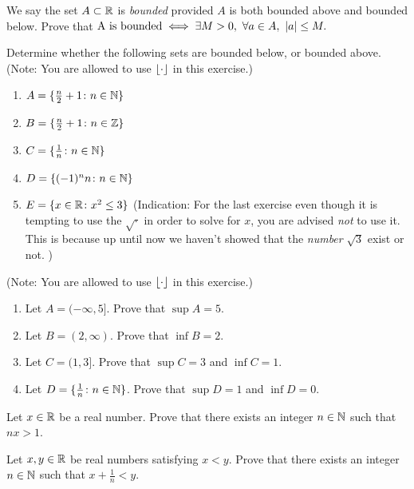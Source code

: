 \documentclass[10pt, a4paper]{article}
\begin{document}
{}

\begin{exercise}
  We say the set \(A\subset\mathbb{R}\) is \emph{bounded} provided \(A\) is
  both bounded above and bounded below.
  Prove that %
  \(
    \text{A is bounded}\iff
    \exists M>0,~\forall a\in A,~\lvert a\rvert\leq M.
  \)
\end{exercise}

\begin{exercise}
  Determine whether the following sets are bounded below, or bounded above.
  (\textsf{Note:} You are allowed to use \(\lfloor\cdot\rfloor\) in this exercise.)
  \begin{enumerate}
  \item \(A = \{\frac{n}{2}+1 \colon n\in \mathbb{N}\}\)
  \item \(B = \{\frac{n}{2}+1 \colon n\in \mathbb{Z}\}\)
  \item \(C = \{\frac{1}{n} \colon n\in\mathbb{N}\}\)
  \item \(D = \{ (-1)^n n \colon n\in\mathbb{N}\}\)
  \item \(E = \{ x\in\mathbb{R} \colon x^2\leq 3\}\)
    (\textsf{Indication:}
    For the last exercise even though it is tempting to use the
    \(\sqrt{\cdot}\) in order to solve for \(x\), you are advised \emph{not}
    to use it. This is because up until now we haven't showed that the
    \emph{number} \(\sqrt{3}\) exist or not.
    )
  \end{enumerate}
\end{exercise}

\begin{exercise}
  (\textsf{Note:} You are allowed to use \(\lfloor\cdot\rfloor\) in this exercise.)
  \begin{enumerate}
  \item Let \(A = (-\infty, 5]\). Prove that \(\sup A = 5\).
  \item Let \(B = (2, \infty)\). Prove that \(\inf B = 2\).
  \item Let \(C = (1, 3]\). Prove that \(\sup C = 3\) and \(\inf C=1\).
  \item Let \(D = \{\frac{1}{n}\colon n\in\mathbb{N}\}\). Prove that \(\sup D=1\) and \(\inf D=0\).
  \end{enumerate}
\end{exercise}

\begin{exercise}
  Let \(x\in\mathbb{R}\) be a real number. Prove that there exists an integer
  \(n\in\mathbb{N}\) such that \(nx > 1\).
\end{exercise}
\begin{exercise}
  Let \(x,y\in\mathbb{R}\) be real numbers satisfying \(x<y\).
  Prove that there exists an integer \(n\in\mathbb{N}\) such that
  \(x + \frac1n < y.\)
\end{exercise}
\end{document}
